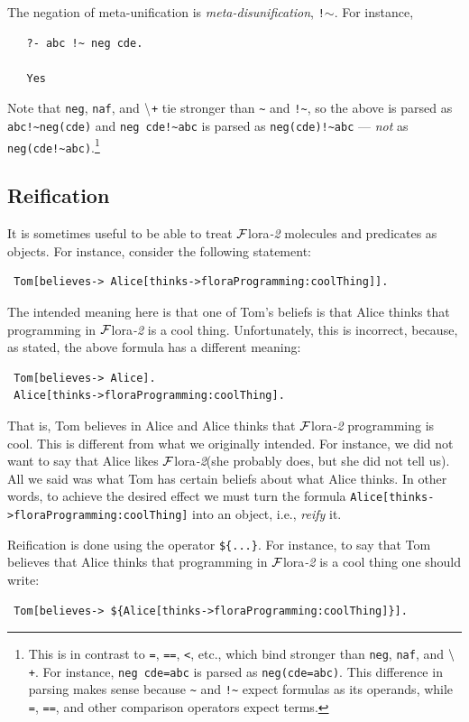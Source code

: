 \documentclass[11pt]{article}
\newcommand{\FLORA}{{\mbox{\sc ${\cal F}${lora}\rm\emph{-2}}}\xspace}
\newcommand{\PLGNAF}{\mbox{\tt \ensuremath{\tt\backslash}+}\xspace}
\newcommand{\SILKNAF}{{{\tt naf}}\xspace}
\begin{document}
The negation of meta-unification is \emph{meta-disunification}, {\tt !$\sim$}. 
For instance,
\begin{verbatim}
   ?- abc !~ neg cde.

   Yes
\end{verbatim}
Note that {\tt neg}, \SILKNAF, and \PLGNAF tie stronger than \verb|~| and
\verb|!~|, so the above is parsed as \verb|abc!~neg(cde)| and
\verb|neg cde!~abc| is parsed as  \verb|neg(cde)!~abc| --- \emph{not} as
\verb|neg(cde!~abc)|.\footnote{
  This is in contrast to {\tt =}, {\tt ==}, {\tt <}, etc., which bind
  stronger than {\tt neg}, \SILKNAF, and \PLGNAF. For instance, {\tt neg
    cde=abc} is parsed as {\tt neg(cde=abc)}. This difference in parsing
  makes sense because {\tt \~{}}  and
  {\tt !\~{}}  expect formulas as its
  operands, while {\tt =}, {\tt ==}, and other comparison operators expect
  terms.
  }
 

\subsection{Reification}
\label{sec-reification}

It is sometimes useful to be able to treat \FLORA molecules and predicates
as objects. For instance, consider the following statement:
\begin{verbatim}
 Tom[believes-> Alice[thinks->floraProgramming:coolThing]].
\end{verbatim}
The intended meaning here is that one of Tom's beliefs is that Alice
thinks that programming in \FLORA is a cool thing. Unfortunately, this is
incorrect, because, as stated, the above formula has a different meaning:
\begin{verbatim}
 Tom[believes-> Alice].
 Alice[thinks->floraProgramming:coolThing].  
\end{verbatim}
That is, Tom believes in Alice and Alice thinks that \FLORA programming is
cool. This is different from what we originally intended. For instance, we
did not want to say that Alice likes \FLORA (she probably does, but she did
not tell us). All we said was what Tom has certain beliefs about what Alice
thinks. In other words, to achieve the desired effect we must turn the
formula {\tt Alice[thinks->floraProgramming:coolThing]} into an object,
i.e., \emph{reify} it.

Reification is done using the operator {\tt \$\{...\}}. For instance, to
say that Tom believes that Alice thinks that programming in \FLORA is a
cool thing one should write:
\begin{verbatim}
 Tom[believes-> ${Alice[thinks->floraProgramming:coolThing]}].
\end{verbatim}
\end{document}
